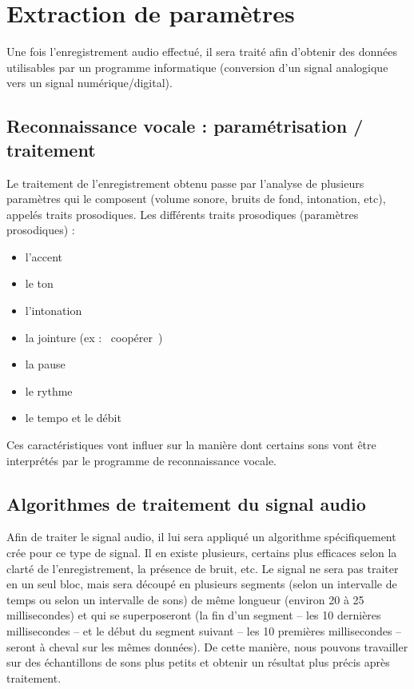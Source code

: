 \documentclass[a4paper, 12pt]{book}
\newcounter{program}[subsection]
\begin{document}

\section{Extraction de paramètres}

Une fois l’enregistrement audio effectué, il sera traité afin d'obtenir des données utilisables par un programme informatique (conversion d’un signal analogique vers un signal numérique/digital).

\subsection{Reconnaissance vocale : paramétrisation / traitement}

Le traitement de l’enregistrement obtenu passe par l’analyse de plusieurs paramètres qui le composent (volume sonore, bruits de fond, intonation, etc), appelés traits prosodiques. Les différents traits prosodiques (paramètres prosodiques) :

\begin{itemize}
    \item l’accent 
    \item le ton 
    \item l’intonation 
    \item la jointure (ex : \guillemotleft{}~coopérer~\guillemotright{}) 
    \item la pause 
    \item le rythme
    \item le tempo et le débit
\end{itemize}

Ces caractéristiques vont influer sur la manière dont certains sons vont être interprétés par le programme de reconnaissance vocale.

\subsection{Algorithmes de traitement du signal audio}

Afin de traiter le signal audio, il lui sera appliqué un algorithme spécifiquement crée pour ce type de signal. Il en existe plusieurs, certains plus efficaces selon la clarté de l’enregistrement, la présence de bruit, etc. Le signal ne sera pas traiter en un seul bloc, mais sera découpé en plusieurs segments (selon un intervalle de temps ou selon un intervalle de sons) de même longueur (environ 20 à 25 millisecondes) et qui se superposeront (la fin d’un segment – les 10 dernières millisecondes – et le début du segment suivant – les 10 premières millisecondes – seront à cheval sur les mêmes données). De cette manière, nous pouvons travailler sur des échantillons de sons plus petits et obtenir un résultat plus précis après traitement.
\end{document}
